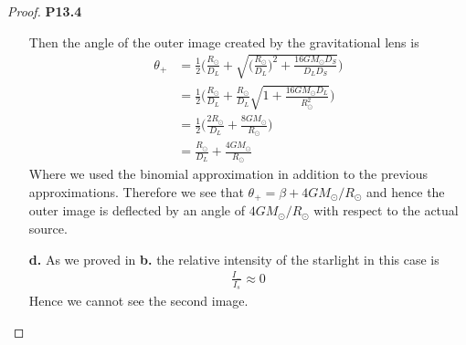 \documentclass[11pt]{article}
\theoremstyle{definition}
\begin{document}
\begin{proof}{\textbf{P13.4}}
\begin{itemize}
    Then the angle of the outer image created by the gravitational lens is
    \begin{align*}
        \theta_+ &= \frac{1}{2}\Bigg(
            \frac{R_\odot}{D_L}
            + \sqrt{\bigg(\frac{R_\odot}{D_L}\bigg)^2
            + \frac{16GM_\odot D_S}{D_LD_S}}
        \Bigg)\\
        &= \frac{1}{2}\Bigg(
            \frac{R_\odot}{D_L}
            + \frac{R_\odot}{D_L}\sqrt{1 + \frac{16GM_\odot D_L}{R_\odot^2}}
        \Bigg)\\
        &= \frac{1}{2}\Bigg(
            \frac{2R_\odot}{D_L} + \frac{8GM_\odot}{R_\odot}
        \Bigg)\\
        &= \frac{R_\odot}{D_L} + \frac{4GM_\odot}{R_\odot}
    \end{align*}
    Where we used the binomial approximation in addition to the previous
    approximations.
    Therefore we see that $\theta_+ = \beta + 4GM_\odot/R_\odot$ and hence the
    outer image is deflected by an angle of $4GM_\odot/R_\odot$ with respect
    to the actual source.

    \item [\textbf{d.}] As we proved in \textbf{b.} the relative intensity
    of the starlight in this case is
    \begin{align*}
        \frac{I_-}{I_s} \approx 0
    \end{align*}
    Hence we cannot see the second image.
\end{itemize}
\end{proof}
\end{document}
